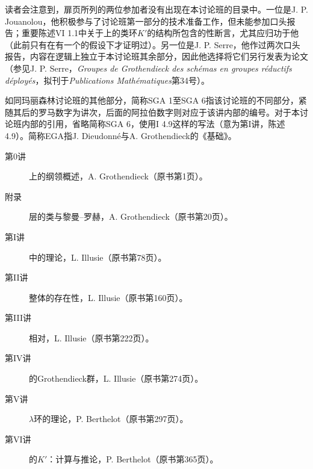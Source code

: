 读者会注意到，扉页所列的两位参加者没有出现在本讨论班的目录中。一位是J. P. Jouanolou，他积极参与了讨论班第一部分的技术准备工作，但未能参加口头报告；重要陈述VI 1.1中关于上的类环$K'$的结构所包含的性断言，尤其应归功于他（此前只有在有一个的假设下才证明过）。另一位是J. P. Serre，他作过两次口头报告，内容在逻辑上独立于本讨论班其余部分，因此他选择将它们另行发表为论文（参见J. P. Serre，\textit{Groupes de Grothendieck des schémas en groupes réductifs déployés}，拟刊于\textit{Publications Mathématiques}第34号）。

如同玛丽森林讨论班的其他部分，简称SGA 1至SGA 6指该讨论班的不同部分，紧随其后的罗马数字为讲次，后面的阿拉伯数字则对应于该讲内部的编号。对于本讨论班内部的引用，省略简称SGA 6，使用I 4.9这样的写法（意为第I讲，陈述4.9）。简称EGA指J. Dieudonné与A. Grothendieck的《基础》。
\begin{description}
\item[第0讲] 上的纲领概述，A. Grothendieck（原书第1页）。
\item[附录] 层的类与黎曼--罗赫，A. Grothendieck（原书第20页）。
\item[第I讲] 中的理论，L. Illusie（原书第78页）。
\item[第II讲] 整体的存在性，L. Illusie（原书第160页）。
\item[第III讲] 相对，L. Illusie（原书第222页）。
\item[第IV讲] 的Grothendieck群，L. Illusie（原书第274页）。
\item[第V讲] $\lambda$环的理论，P. Berthelot（原书第297页）。
\item[第VI讲] 的$K'$：计算与推论，P. Berthelot（原书第365页）。
\end{description}
